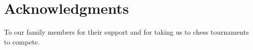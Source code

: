 
\chapter*{Acknowledgments}

To our family members for their support and for taking us to chess tournaments to compete.












